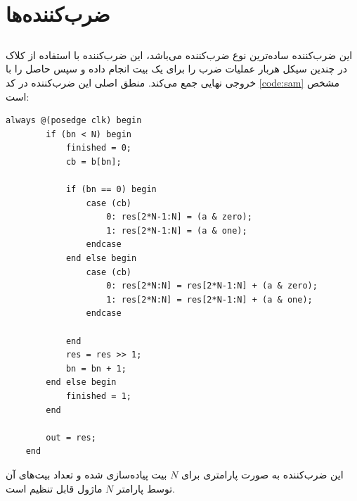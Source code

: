 \documentclass{article}
\begin{document}
\section{ضرب‌کننده‌ها}
\subsection{}
این ضرب‌کننده ساده‌ترین نوع ضرب‌کننده می‌باشد، این ضرب‌کننده با استفاده از کلاک در چندین سیکل هربار عملیات ضرب را برای یک بیت انجام داده و سپس حاصل را با خروجی نهایی جمع می‌کند. منطق اصلی این ضرب‌کننده در کد \ref{code:sam} مشخص است:
\begin{LTR}
\begin{lstlisting}[caption={\rl{پیاده‌سازی \lr{Shift-Add Multiplier}}​},label=code:sam,style=verilog]
always @(posedge clk) begin
        if (bn < N) begin
            finished = 0;
            cb = b[bn];

            if (bn == 0) begin
                case (cb)
                    0: res[2*N-1:N] = (a & zero);
                    1: res[2*N-1:N] = (a & one);
                endcase
            end else begin
                case (cb)
                    0: res[2*N:N] = res[2*N-1:N] + (a & zero);
                    1: res[2*N:N] = res[2*N-1:N] + (a & one);
                endcase

            end
            res = res >> 1;
            bn = bn + 1;
        end else begin
            finished = 1;
        end

        out = res;
    end
\end{lstlisting}
\end{LTR}
\noindent
این ضرب‌کننده به صورت پارامتری برای $N$ بیت پیاده‌سازی شده و تعداد بیت‌های آن توسط پارامتر $N$ ماژول قابل تنظیم است.
\end{document}
